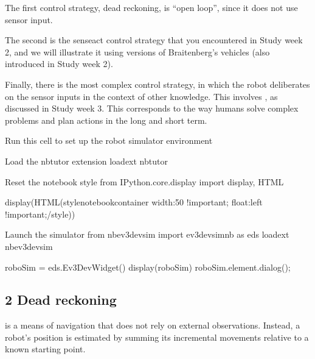\documentclass[letterpaper,10pt,english]{sphinxmanual}
\begin{document}
The first control strategy, dead reckoning, is “open loop”, since it does not use sensor input.

The second is the sense\textendash{}act control strategy that you encountered in Study week 2, and we will illustrate it using versions of Braitenberg’s vehicles (also introduced in Study week 2).

Finally, there is the most complex control strategy, in which the robot deliberates on the sensor inputs in the context of other knowledge. This involves , as discussed in Study week 3. This corresponds to the way humans solve complex problems and plan actions in the long and short term.

{
\begin{sphinxVerbatim}[commandchars=\\\{\}]
\llap{\color{nbsphinxin}[ ]:\,\hspace{\fboxrule}\hspace{\fboxsep}}\PYGZsh{} Run this cell to set up the robot simulator environment

\PYGZsh{}Load the nbtutor extension
\PYGZpc{}load\PYGZus{}ext nbtutor

\PYGZsh{}Reset the notebook style
from IPython.core.display import display, HTML

display(HTML(\PYGZdq{}\PYGZlt{}style\PYGZgt{}\PYGZsh{}notebook\PYGZhy{}container \PYGZob{} width:50\PYGZpc{} !important; float:left !important;\PYGZcb{}\PYGZlt{}/style\PYGZgt{}\PYGZdq{}))


\PYGZsh{}Launch the simulator
from nbev3devsim import ev3devsim\PYGZus{}nb as eds
\PYGZpc{}load\PYGZus{}ext nbev3devsim

roboSim = eds.Ev3DevWidget()
display(roboSim)
roboSim.element.dialog();
\end{sphinxVerbatim}
}


\subsection{2 Dead reckoning}
\label{\detokenize{content/03_Robot_Lab/Section_00_02:2-Dead-reckoning}}\label{\detokenize{content/03_Robot_Lab/Section_00_02::doc}}
 is a means of navigation that does not rely on external observations. Instead, a robot’s position is estimated by summing its incremental movements relative to a known starting point.
\end{document}
